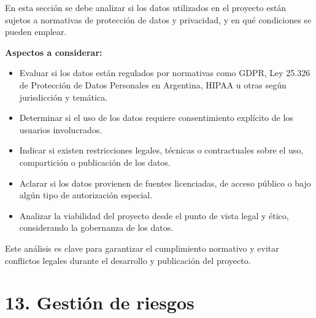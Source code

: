 \documentclass[
11pt, %
]{ProyectoVpC}
\begin{document}
En esta sección se debe analizar si los datos utilizados en el proyecto están sujetos a normativas de protección de datos y privacidad, y en qué condiciones se pueden emplear.

\textbf{Aspectos a considerar:}
\begin{itemize}
  \item Evaluar si los datos están regulados por normativas como GDPR, Ley 25.326 de Protección de Datos Personales en Argentina, HIPAA u otras según jurisdicción y temática.
  \item Determinar si el uso de los datos requiere consentimiento explícito de los usuarios involucrados.
  \item Indicar si existen restricciones legales, técnicas o contractuales sobre el uso, compartición o publicación de los datos.
  \item Aclarar si los datos provienen de fuentes licenciadas, de acceso público o bajo algún tipo de autorización especial.
  \item Analizar la viabilidad del proyecto desde el punto de vista legal y ético, considerando la gobernanza de los datos.
\end{itemize}

Este análisis es clave para garantizar el cumplimiento normativo y evitar conflictos legales durante el desarrollo y publicación del proyecto.


\section{13. Gestión de riesgos}
\label{sec:riesgos}
\end{document}
